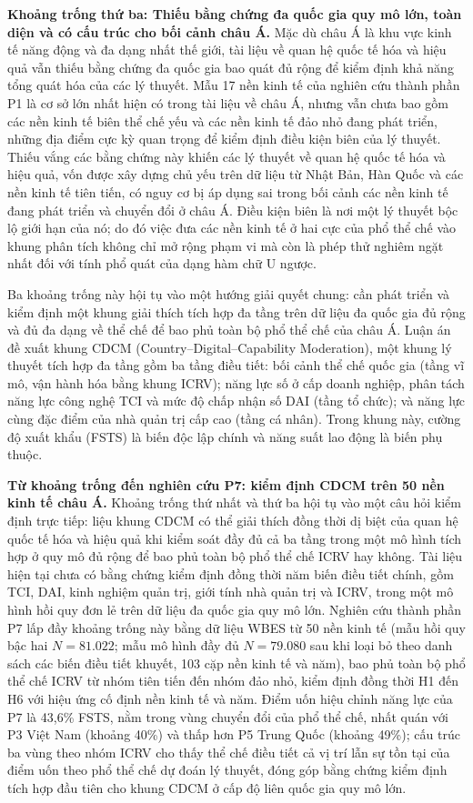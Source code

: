 \documentclass[
  a4paper,
  13pt]{extreport}
\begin{document}
\textbf{Khoảng trống thứ ba: Thiếu bằng chứng đa quốc gia quy mô lớn,
toàn diện và có cấu trúc cho bối cảnh châu Á.} Mặc dù châu Á là khu vực
kinh tế năng động và đa dạng nhất thế giới, tài liệu về quan hệ quốc tế
hóa và hiệu quả vẫn thiếu bằng chứng đa quốc gia bao quát đủ rộng để
kiểm định khả năng tổng quát hóa của các lý thuyết. Mẫu 17 nền kinh tế
của nghiên cứu thành phần P1 là cơ sở lớn nhất hiện có trong tài liệu về
châu Á, nhưng vẫn chưa bao gồm các nền kinh tế biên thể chế yếu và các
nền kinh tế đảo nhỏ đang phát triển, những địa điểm cực kỳ quan trọng để
kiểm định điều kiện biên của lý thuyết. Thiếu vắng các bằng chứng này
khiến các lý thuyết về quan hệ quốc tế hóa và hiệu quả, vốn được xây
dựng chủ yếu trên dữ liệu từ Nhật Bản, Hàn Quốc và các nền kinh tế tiên
tiến, có nguy cơ bị áp dụng sai trong bối cảnh các nền kinh tế đang phát
triển và chuyển đổi ở châu Á. Điều kiện biên là nơi một lý thuyết bộc lộ
giới hạn của nó; do đó việc đưa các nền kinh tế ở hai cực của phổ thể
chế vào khung phân tích không chỉ mở rộng phạm vi mà còn là phép thử
nghiêm ngặt nhất đối với tính phổ quát của dạng hàm chữ U ngược.

Ba khoảng trống này hội tụ vào một hướng giải quyết chung: cần phát
triển và kiểm định một khung giải thích tích hợp đa tầng trên dữ liệu đa
quốc gia đủ rộng và đủ đa dạng về thể chế để bao phủ toàn bộ phổ thể chế
của châu Á. Luận án đề xuất khung CDCM (Country--Digital--Capability
Moderation), một khung lý thuyết tích hợp đa tầng gồm ba tầng điều tiết:
bối cảnh thể chế quốc gia (tầng vĩ mô, vận hành hóa bằng khung ICRV);
năng lực số ở cấp doanh nghiệp, phân tách năng lực công nghệ TCI và mức
độ chấp nhận số DAI (tầng tổ chức); và năng lực cùng đặc điểm của nhà
quản trị cấp cao (tầng cá nhân). Trong khung này, cường độ xuất khẩu
(FSTS) là biến độc lập chính và năng suất lao động là biến phụ thuộc.

\textbf{Từ khoảng trống đến nghiên cứu P7: kiểm định CDCM trên 50 nền
kinh tế châu Á.} Khoảng trống thứ nhất và thứ ba hội tụ vào một câu hỏi
kiểm định trực tiếp: liệu khung CDCM có thể giải thích đồng thời dị biệt
của quan hệ quốc tế hóa và hiệu quả khi kiểm soát đầy đủ cả ba tầng
trong một mô hình tích hợp ở quy mô đủ rộng để bao phủ toàn bộ phổ thể
chế ICRV hay không. Tài liệu hiện tại chưa có bằng chứng kiểm định đồng
thời năm biến điều tiết chính, gồm TCI, DAI, kinh nghiệm quản trị, giới
tính nhà quản trị và ICRV, trong một mô hình hồi quy đơn lẻ trên dữ liệu
đa quốc gia quy mô lớn. Nghiên cứu thành phần P7 lấp đầy khoảng trống
này bằng dữ liệu WBES từ 50 nền kinh tế (mẫu hồi quy bậc hai
\(N = 81.022\); mẫu mô hình đầy đủ \(N = 79.080\) sau khi loại bỏ theo
danh sách các biến điều tiết khuyết, 103 cặp nền kinh tế và năm), bao
phủ toàn bộ phổ thể chế ICRV từ nhóm tiên tiến đến nhóm đảo nhỏ, kiểm
định đồng thời H1 đến H6 với hiệu ứng cố định nền kinh tế và năm. Điểm
uốn hiệu chỉnh năng lực của P7 là 43,6\% FSTS, nằm trong vùng chuyển đổi
của phổ thể chế, nhất quán với P3 Việt Nam (khoảng 40\%) và thấp hơn P5
Trung Quốc (khoảng 49\%); cấu trúc ba vùng theo nhóm ICRV cho thấy thể
chế điều tiết cả vị trí lẫn sự tồn tại của điểm uốn theo phổ thể chế dự
đoán lý thuyết, đóng góp bằng chứng kiểm định tích hợp đầu tiên cho
khung CDCM ở cấp độ liên quốc gia quy mô lớn.
\end{document}

